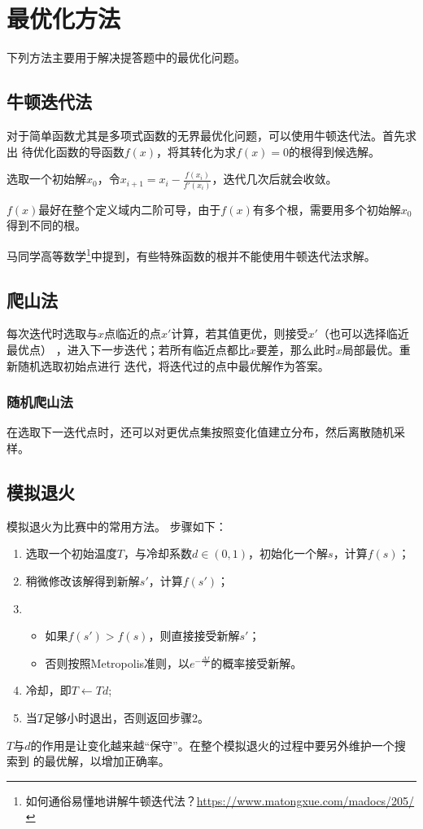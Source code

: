 \section{最优化方法}
下列方法主要用于解决提答题中的最优化问题。
\subsection{牛顿迭代法}
对于简单函数尤其是多项式函数的无界最优化问题，可以使用牛顿迭代法。首先求出
待优化函数的导函数$f(x)$，将其转化为求$f(x)=0$的根得到候选解。

选取一个初始解$x_0$，令$x_{i+1}=x_i-\frac{f(x_i)}{f'(x_i)}$，迭代几次后就会收敛。

$f(x)$最好在整个定义域内二阶可导，由于$f(x)$有多个根，需要用多个初始解$x_0$得到不同的根。

马同学高等数学\footnote{
	如何通俗易懂地讲解牛顿迭代法？\url{https://www.matongxue.com/madocs/205/}
}中提到，有些特殊函数的根并不能使用牛顿迭代法求解。
\subsection{爬山法}
每次迭代时选取与$x$点临近的点$x'$计算，若其值更优，则接受$x'$（也可以选择临近最优点）
，进入下一步迭代；若所有临近点都比$x$要差，那么此时$x$局部最优。重新随机选取初始点进行
迭代，将迭代过的点中最优解作为答案。
\subsubsection{随机爬山法}
在选取下一迭代点时，还可以对更优点集按照变化值建立分布，然后离散随机采样。
\subsection{模拟退火}
模拟退火为比赛中的常用方法。
步骤如下：
\begin{enumerate}
	\item 选取一个初始温度$T$，与冷却系数$d\in (0,1)$，初始化一个解$s$，计算$f(s)$；
	\item 稍微修改该解得到新解$s'$，计算$f(s')$；
	\item \begin{itemize}
		      \item 如果$f(s')>f(s)$，则直接接受新解$s'$；
		      \item 否则按照Metropolis准则，以$e^{-\frac{\Delta f}{T}}$的概率接受新解。
	      \end{itemize}
	\item 冷却，即$T\leftarrow Td$;
	\item 当$T$足够小时退出，否则返回步骤2。
\end{enumerate}
$T$与$d$的作用是让变化越来越``保守''。在整个模拟退火的过程中要另外维护一个搜索到
的最优解，以增加正确率。

